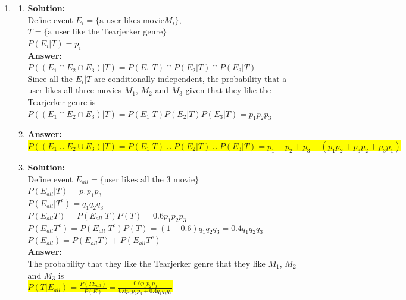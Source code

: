 \documentclass{article}
\newcommand{\myansw}{\textbf{Answer:}\\}
\newcommand{\mysolu}{\textbf{Solution:}\\}
\begin{document}
\begin{enumerate}
\begin{enumerate}
		${P(G)=1-P(G^c)=0.149}$\\
		\myansw
		\colorbox{yellow}{
			${P(E|G)=\frac{P(EG)}{P(G)}=\frac{P(E)}{P(G)}=0.121}$
		}\\
	\end{enumerate}
	\item
	\begin{enumerate}
		\item
		\mysolu
		Define event ${E_i=\{\text{a user likes movie} M_i\}}$,${T=\{\text{a user like the Tearjerker genre}\}}$\\
		${P(E_i|T)=p_i}$\\
		\myansw
		${P((E_1 \cap E_2 \cap E_3)|T)=P(E_1|T)\cap P(E_2|T)\cap P(E_3|T)}$\\
		Since all the ${E_i|T}$ are conditionally independent, the probability that a user likes all three movies $M_1$, $M_2$ and $M_3$ given that they like the Tearjerker genre is\\
		${P((E_1 \cap E_2 \cap E_3)|T)=P(E_1|T)P(E_2|T)P(E_3|T)=p_1 p_2 p_3}$
		\item
		\myansw
		\colorbox{yellow}{
			${P((E_1 \cup E_2 \cup E_3)|T)=P(E_1|T) \cup P(E_2|T) \cup P(E_3|T) = p_1+p_2+p_3 - (p_1 p_2+p_3 p_2+p_3 p_1)}$
		}\\
		\item
		\mysolu
		Define event ${E_{all}=\{\text{user likes all the 3 movie}\}}$\\
		${P(E_{all}|T)=p_1 p_1 p_3}$\\
		${P(E_{all}|T^c)=q_1 q_2 q_3}$\\
		${P(E_{all}T)=P(E_{all}|T)P(T)=0.6 p_1 p_2 p_3}$\\
		${P(E_{all}T^c)=P(E_{all}|T^c)P(T)=(1-0.6) q_1 q_2 q_3=0.4 q_1 q_2 q_3 }$\\
		${P(E_{all})=P(E_{all}T)+P(E_{all}T^c)}$\\
		\myansw
		The probability that they like the Tearjerker genre that they like $M_1$, $M_2$ and $M_3$ is\\
		\colorbox{yellow}{
			${P(T|E_{all})=\frac{P(TE_{all})}{P(E)}=\frac{0.6 p_1 p_2 p_3}{0.6 p_1 p_2 p_3+0.4 q_1 q_2 q_3}}$
		}\\
		

\end{enumerate}
\end{enumerate}
\end{document}
